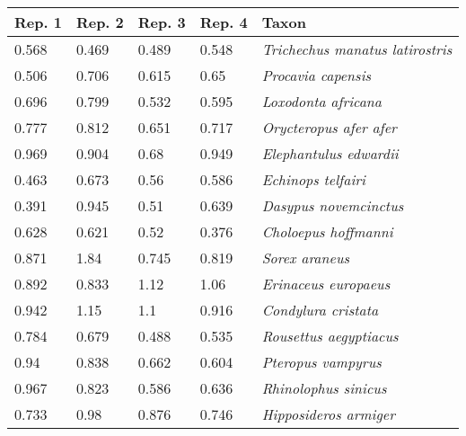 \begin{tabular}{lllll}
\toprule
         Rep. 1 &          Rep. 2 &          Rep. 3 &          Rep. 4 &                                         Taxon \\
\midrule
          0.568 &           0.469 &           0.489 &           0.548 &       \textit{Trichechus manatus latirostris} \\
          0.506 &           0.706 &           0.615 &            0.65 &                    \textit{Procavia capensis} \\
          0.696 &           0.799 &           0.532 &           0.595 &                   \textit{Loxodonta africana} \\
          0.777 &           0.812 &           0.651 &           0.717 &                \textit{Orycteropus afer afer} \\
          0.969 &           0.904 &            0.68 &           0.949 &                \textit{Elephantulus edwardii} \\
          0.463 &           0.673 &            0.56 &           0.586 &                    \textit{Echinops telfairi} \\
          0.391 &           0.945 &            0.51 &           0.639 &                 \textit{Dasypus novemcinctus} \\
          0.628 &           0.621 &            0.52 &           0.376 &                  \textit{Choloepus hoffmanni} \\
          0.871 &            1.84 &           0.745 &           0.819 &                        \textit{Sorex araneus} \\
          0.892 &           0.833 &            1.12 &            1.06 &                  \textit{Erinaceus europaeus} \\
          0.942 &            1.15 &             1.1 &           0.916 &                   \textit{Condylura cristata} \\
          0.784 &           0.679 &           0.488 &           0.535 &                \textit{Rousettus aegyptiacus} \\
           0.94 &           0.838 &           0.662 &           0.604 &                    \textit{Pteropus vampyrus} \\
          0.967 &           0.823 &           0.586 &           0.636 &                  \textit{Rhinolophus sinicus} \\
          0.733 &            0.98 &           0.876 &           0.746 &                 \textit{Hipposideros armiger} \\

\end{tabular}
